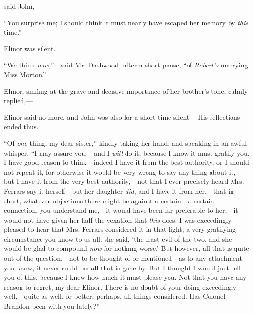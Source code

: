  said John, 

“You surprise me; I should think it must nearly have escaped her memory by {\em this} time.”


Elinor was silent.

“We think {\em now},”---said Mr. Dashwood, after a short pause, “of {\em Robert's} marrying Miss Morton.”

Elinor, smiling at the grave and decisive importance of her brother's tone, calmly replied,---





Elinor said no more, and John was also for a short time silent.---His reflections ended thus.

“Of {\em one} thing, my dear sister,” kindly taking her hand, and speaking in an awful whisper, “I may assure you;---and I {\em will} do it, because I know it must gratify you. I have good reason to think---indeed I have it from the best authority, or I should not repeat it, for otherwise it would be very wrong to say any thing about it,---but I have it from the very best authority,---not that I ever precisely heard Mrs. Ferrars say it herself---but her daughter {\em did}, and I have it from her,---that in short, whatever objections there might be against a certain---a certain connection, you understand me,---it would have been far preferable to her,---it would not have given her half the vexation that {\em this} does. I was exceedingly pleased to hear that Mrs. Ferrars considered it in that light; a very gratifying circumstance you know to us all.  she said, ‘the least evil of the two, and she would be glad to compound {\em now} for nothing worse.' But however, all that is quite out of the question,---not to be thought of or mentioned---as to any attachment you know, it never could be: all that is gone by. But I thought I would just tell you of this, because I knew how much it must please you. Not that you have any reason to regret, my dear Elinor. There is no doubt of your doing exceedingly well,---quite as well, or better, perhaps, all things considered. Has Colonel Brandon been with you lately?”

